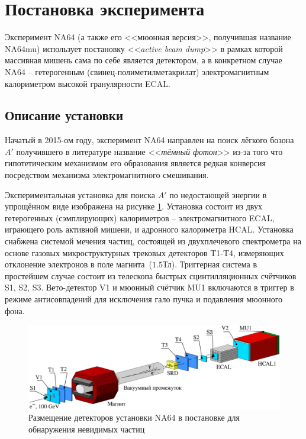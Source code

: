\section{Постановка эксперимента}

Эксперимент NA64 (а также его <<мюонная версия>>, получившая название
NA64mu) использует постановку <<\emph{active beam dump}>> в рамках
которой массивная мишень сама по себе является детектором, а в конкретном
случае NA64 -- гетерогенным (свинец-полиметилметакрилат) электромагнитным
калориметром высокой гранулярности ECAL.

\subsection{Описание установки}

Начатый в 2015-ом году, эксперимент NA64 
направлен на поиск лёгкого бозона $A'$ получившего в литературе название
<<\emph{тёмный фотон}>> из-за того что гипотетическим механизмом его
образования является редкая конверсия посредством механизма электромагнитного
смешивания.

Экспериментальная установка для поиска $A'$ по недостающей энергии
в упрощённом виде изображена на рисунке \ref{fig:setup-schematic-invis}.
Установка состоит из двух гетерогенных (сэмплирующих)
калориметров -- электромагнитного ECAL, играющего роль активной мишени,
и адронного калориметра HCAL.
Установка снабжена системой мечения частиц, состоящей из
двухплечевого спектрометра на основе газовых микроструктурных трековых
детекторов T1-T4, измеряющих отклонение электронов в поле
магнита~($1.5\text{Тл}$). Триггерная система в простейшем случае
состоит из телескопа быстрых сцинтилляционных счётчиков S1, S2, S3.
Вето-детектор V1 и мюонный счётчик MU1 включаются в триггер в
режиме антисовпадений для исключения гало пучка и подавления мюонного
фона.

\begin{figure}
    \centering
    \includegraphics[width=1\linewidth]{images/illustrative/setup-schematic.eps}
    \caption{Размещение детекторов установки NA64 в постановке для обнаружения невидимых частиц}
    \label{fig:setup-schematic-invis}
\end{figure}

